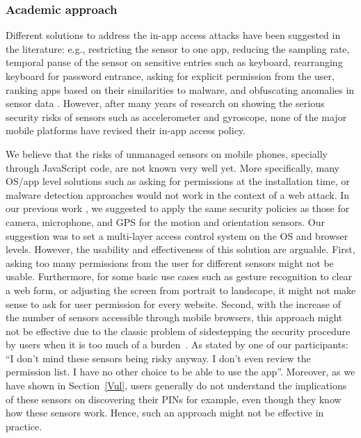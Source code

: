 \documentclass[10pt,twocolumn]{article}
\begin{document}
\subsubsection{Academic approach} 
Different solutions to address the in-app access attacks have been suggested in the literature: e.g.,  
restricting the sensor to one app, reducing the sampling rate, temporal pause of the sensor on sensitive entries such as keyboard, rearranging keyboard for password entrance, asking for explicit permission from the user, ranking apps based on their similarities to malware, and obfuscating anomalies in sensor data \cite{KeyMic,Tapprints2,SkimLight,taplogger,PINCamera,Speech:Gyr,Tapprints,accessory,Finger,Finger2}. 
However, after many years of research on showing the serious security risks of sensors such as accelerometer and gyroscope, none of the major mobile platforms have revised their in-app access policy.

We believe that the risks of unmanaged sensors on mobile phones, specially through JavaScript code, are not known very well yet. More specifically, many OS/app level solutions such as asking for permissions at the installation time, or malware detection approaches would not work in the context of a web attack. 
In our previous work \cite{Mehrnezhad}, we suggested to apply the same security policies as those for camera, microphone, and GPS for the motion and orientation sensors. Our suggestion was to set a multi-layer access control system on the OS and browser levels. However, the usability and effectiveness of this solution are arguable. 
First, asking too many permissions from the user for different sensors might not be usable. 
Furthermore, for some basic use cases such as gesture recognition to clear a web form, or adjusting the screen from portrait to landscape, it might not make sense to ask for user permission for every website. 
Second, with the increase of the number of sensors accessible through mobile browsers, this approach might not be effective due to the classic problem of sidestepping the security procedure by users when it is too much of a burden~\cite{attention}. 
As stated by one of our participants: ``I don't mind these sensors being risky anyway. I don't even review the permission list. I have no other choice to be able to use the app''.
Moreover, as we have shown in Section~\ref{Vul}, users generally do not understand the implications of these sensors on discovering their PINs for example, even though they know how these sensors work. Hence, such an approach might not be effective in practice.   
 
\end{document}
